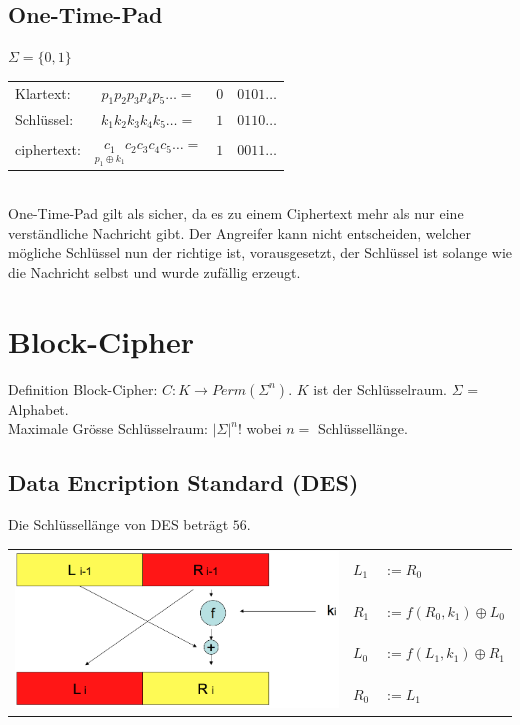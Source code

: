 \documentclass[landscape,twocolumn,a4paper]{article}
\newcommand{\Unten}[2]{\underset{#1}{#2}} %
\begin{document}
\subsection{One-Time-Pad}
$\Sigma=\{0,1\}$
\begin{tabular}{lc|c|l}\cline{3-3}
Klartext:& $p_1p_2p_3p_4p_5\dots=$&$0$&$0101\dots$\\
Schlüssel:& $k_1k_2k_3k_4k_5\dots=$&$1$&$0110\dots$\\
ciphertext:& $\Unten{p_1\oplus k_1}{c_1}c_2c_3c_4c_5\dots=$&$1$&$0011\dots$\\\cline{3-3}
\end{tabular} \\
One-Time-Pad gilt als sicher, da es zu einem Ciphertext mehr als nur eine verständliche Nachricht gibt. Der Angreifer kann nicht entscheiden, welcher mögliche Schlüssel nun der richtige ist, vorausgesetzt, der Schlüssel ist solange wie die Nachricht selbst und wurde zufällig erzeugt.

\section{Block-Cipher}
Definition Block-Cipher: $C: K \rightarrow Perm(\Sigma^n)$. $K$ ist der Schlüsselraum. $\Sigma$ = Alphabet.\\
Maximale Grösse Schlüsselraum: $|\Sigma|^n!$ wobei $n = $ Schlüssellänge. 
\subsection{Data Encription Standard (DES)}
Die Schlüssellänge von DES beträgt $56$.
\begin{tabular}{l | l l}
	\multirow{4}{*}{\includegraphics[scale=0.12]{horst-feistel.png}} & $L_1$ & $:= R_0$ \\
	&$R_1$ & $:= f(R_0,k_1) \oplus L_0$ \\
	&$L_0$ & $:= f(L_1,k_1) \oplus R_1$ \\
	&$R_0$ & $:= L_1$ \\
\end{tabular} \\
\end{document}
